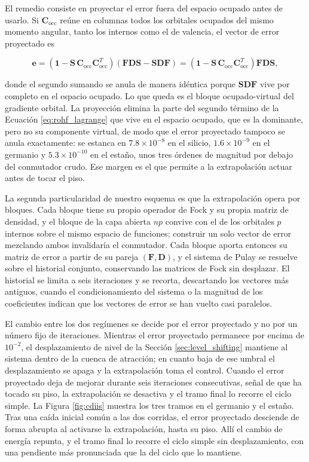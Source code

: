 El remedio consiste en proyectar el error fuera del espacio ocupado antes de usarlo. Si $\bm{C}_{\text{occ}}$ reúne en columnas todos los orbitales ocupados del mismo momento angular, tanto los internos como el de valencia, el vector de error proyectado es

\begin{equation}
    \label{eq:cdiis_error}
    \bm{e} = \left( \bm{1} - \bm{S}\,\bm{C}_{\text{occ}}\bm{C}_{\text{occ}}^{T} \right)\left( \bm{F}\bm{D}\bm{S} - \bm{S}\bm{D}\bm{F} \right) = \left( \bm{1} - \bm{S}\,\bm{C}_{\text{occ}}\bm{C}_{\text{occ}}^{T} \right)\bm{F}\bm{D}\bm{S},
\end{equation}

donde el segundo sumando se anula de manera idéntica porque $\bm{S}\bm{D}\bm{F}$ vive por completo en el espacio ocupado. Lo que queda es el bloque ocupado-virtual del gradiente orbital. La proyección elimina la parte del segundo término de la Ecuación \eqref{eq:rohf_lagrange} que vive en el espacio ocupado, que es la dominante, pero no su componente virtual, de modo que el error proyectado tampoco se anula exactamente: se estanca en $7.8\times10^{-8}$ en el silicio, $1.6\times10^{-9}$ en el germanio y $5.3\times10^{-10}$ en el estaño, unos tres órdenes de magnitud por debajo del conmutador crudo. Ese margen es el que permite a la extrapolación actuar antes de tocar el piso.

La segunda particularidad de nuestro esquema es que la extrapolación opera por bloques. Cada bloque tiene su propio operador de Fock y su propia matriz de densidad, y el bloque de la capa abierta $np$ convive con el de los orbitales $p$ internos sobre el mismo espacio de funciones; construir un solo vector de error mezclando ambos invalidaría el conmutador. Cada bloque aporta entonces su matriz de error a partir de su pareja $(\bm{F}, \bm{D})$, y el sistema de Pulay se resuelve sobre el historial conjunto, conservando las matrices de Fock sin desplazar. El historial se limita a seis iteraciones y se recorta, descartando los vectores más antiguos, cuando el condicionamiento del sistema o la magnitud de los coeficientes indican que los vectores de error se han vuelto casi paralelos.

El cambio entre los dos regímenes se decide por el error proyectado y no por un número fijo de iteraciones. Mientras el error proyectado permanece por encima de $10^{-2}$, el desplazamiento de nivel de la Sección \ref{sec:level_shifting} mantiene al sistema dentro de la cuenca de atracción; en cuanto baja de ese umbral el desplazamiento se apaga y la extrapolación toma el control. Cuando el error proyectado deja de mejorar durante seis iteraciones consecutivas, señal de que ha tocado su piso, la extrapolación se desactiva y el tramo final lo recorre el ciclo simple. La Figura \ref{fig:cdiis} muestra los tres tramos en el germanio y el estaño. Tras una caída inicial común a las dos corridas, el error proyectado desciende de forma abrupta al activarse la extrapolación, hasta su piso. Allí el cambio de energía repunta, y el tramo final lo recorre el ciclo simple sin desplazamiento, con una pendiente más pronunciada que la del ciclo que lo mantiene.

